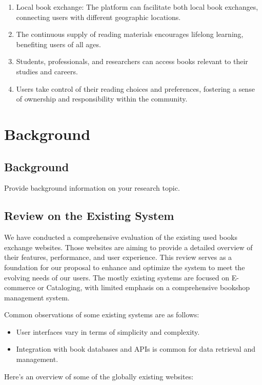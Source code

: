\documentclass{article}
\begin{document}
\begin{enumerate}
     \item Local book exchange: The platform can facilitate both local book exchanges, connecting users with different geographic locations.
     \item The continuous supply of reading materials encourages lifelong learning, benefiting users of all ages.
     \item Students, professionals, and researchers can access books relevant to their studies and careers.
     \item Users take control of their reading choices and preferences, fostering a sense of ownership and responsibility within the community.
   \end{enumerate}

\newpage
\section{Background}
\subsection{Background}
Provide background information on your research topic.

\newpage
\subsection{Review on the Existing System}
We have conducted a comprehensive evaluation of the existing used books exchange websites. Those websites are aiming to provide a detailed overview of their features, performance, and user experience. This review serves as a foundation for our proposal to enhance and optimize the system to meet the evolving needs of our users. The mostly existing systems are focused on E-commerce or Cataloging, with limited emphasis on a comprehensive bookshop management system.

Common observations of some existing systems are as follows:
\begin{itemize}
    \item User interfaces vary in terms of simplicity and complexity.
    \item Integration with book databases and APIs is common for data retrieval and management.
\end{itemize}

Here's an overview of some of the globally existing websites:
\end{document}
